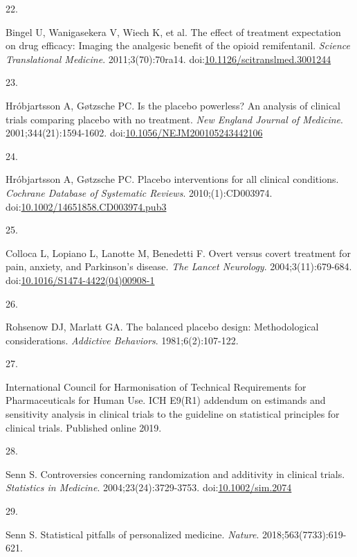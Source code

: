 \documentclass[
  11pt,
]{article}
\newlength{\cslhangindent}
\newlength{\csllabelwidth}
\newenvironment{CSLReferences}[2] %
 {\begin{list}{}{%
  \setlength{\itemindent}{0pt}
  \setlength{\leftmargin}{0pt}
  \setlength{\parsep}{0pt}
  \ifodd #1
   \setlength{\leftmargin}{\cslhangindent}
   \setlength{\itemindent}{-1\cslhangindent}
  \fi
  \setlength{\itemsep}{#2\baselineskip}}}
 {\end{list}}
\newcommand{\CSLLeftMargin}[1]{\parbox[t]{\csllabelwidth}{\strut#1\strut}}
\newcommand{\CSLRightInline}[1]{\parbox[t]{\linewidth - \csllabelwidth}{\strut#1\strut}}
\begin{document}
\begin{CSLReferences}{0}{1}
\CSLLeftMargin{22. }%
\CSLRightInline{Bingel U, Wanigasekera V, Wiech K, et al. The effect of treatment expectation on drug efficacy: Imaging the analgesic benefit of the opioid remifentanil. \emph{Science Translational Medicine}. 2011;3(70):70ra14. doi:\href{https://doi.org/10.1126/scitranslmed.3001244}{10.1126/scitranslmed.3001244}}

\CSLLeftMargin{23. }%
\CSLRightInline{Hróbjartsson A, Gøtzsche PC. Is the placebo powerless? An analysis of clinical trials comparing placebo with no treatment. \emph{New England Journal of Medicine}. 2001;344(21):1594-1602. doi:\href{https://doi.org/10.1056/NEJM200105243442106}{10.1056/NEJM200105243442106}}

\CSLLeftMargin{24. }%
\CSLRightInline{Hróbjartsson A, Gøtzsche PC. Placebo interventions for all clinical conditions. \emph{Cochrane Database of Systematic Reviews}. 2010;(1):CD003974. doi:\href{https://doi.org/10.1002/14651858.CD003974.pub3}{10.1002/14651858.CD003974.pub3}}

\CSLLeftMargin{25. }%
\CSLRightInline{Colloca L, Lopiano L, Lanotte M, Benedetti F. Overt versus covert treatment for pain, anxiety, and {Parkinson's} disease. \emph{The Lancet Neurology}. 2004;3(11):679-684. doi:\href{https://doi.org/10.1016/S1474-4422(04)00908-1}{10.1016/S1474-4422(04)00908-1}}

\CSLLeftMargin{26. }%
\CSLRightInline{Rohsenow DJ, Marlatt GA. The balanced placebo design: Methodological considerations. \emph{Addictive Behaviors}. 1981;6(2):107-122.}

\CSLLeftMargin{27. }%
\CSLRightInline{International Council for Harmonisation of Technical Requirements for Pharmaceuticals for Human Use. {ICH E9(R1)} addendum on estimands and sensitivity analysis in clinical trials to the guideline on statistical principles for clinical trials. Published online 2019.}

\CSLLeftMargin{28. }%
\CSLRightInline{Senn S. Controversies concerning randomization and additivity in clinical trials. \emph{Statistics in Medicine}. 2004;23(24):3729-3753. doi:\href{https://doi.org/10.1002/sim.2074}{10.1002/sim.2074}}

\CSLLeftMargin{29. }%
\CSLRightInline{Senn S. Statistical pitfalls of personalized medicine. \emph{Nature}. 2018;563(7733):619-621.}


\end{CSLReferences}
\end{document}
